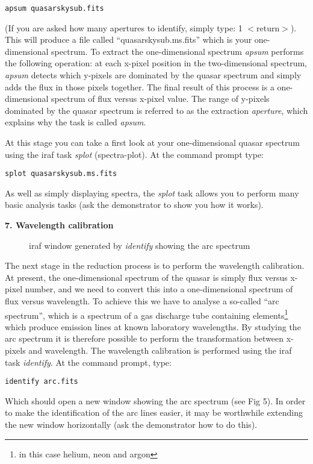 {\tt apsum quasarskysub.fits}

(If you are asked how many apertures to identify, simply type: 1 $<$return$>$).
This will produce a file called ``quasarskysub.ms.fits'' which is your
one-dimensional spectrum. To extract the one-dimensional spectrum
{\it apsum} performs the following operation: at each x-pixel
position in the two-dimensional spectrum, {\it apsum} detects which y-pixels
are dominated by the quasar spectrum and simply adds the flux in those pixels
together. The final result of this process is a one-dimensional
spectrum of flux versus x-pixel value. The range of y-pixels dominated
by the quasar spectrum is referred to as the extraction {\it
aperture}, which explains why the task is called {\it apsum}.

At this stage you can take a first look at your one-dimensional quasar
spectrum using the {\sc iraf} task {\it splot} (spectra-plot). At the
command prompt type:

{\tt splot quasarskysub.ms.fits}

\newpage

As well as simply displaying spectra, the {\it splot} task allows you
to perform many basic analysis tasks (ask the demonstrator to show you
how it works).



{\large {\bf 7. Wavelength calibration}}
\begin{figure}
\centerline{}
\caption{{\sc iraf} window generated by {\it identify} showing the
arc spectrum}
\end{figure}

The next stage in the reduction process is to perform the wavelength
calibration. At present, the one-dimensional spectrum of the quasar is
simply flux versus x-pixel number, and we need to
convert this into a one-dimensional spectrum of flux versus
wavelength. To achieve this we have to analyse a so-called ``arc
spectrum'', which is a spectrum of a gas discharge tube containing
elements\footnote{in this case helium, neon and argon} which produce emission lines at known laboratory
wavelengths. By studying the arc spectrum it is therefore possible to
perform the transformation between x-pixels and wavelength. The
wavelength calibration is performed using the {\sc iraf} task {\it
identify}. At the command prompt, type:

{\tt identify arc.fits}

Which should open a new window showing the arc spectrum (see Fig 5). 
In order to make the identification of the arc lines easier, it
may be worthwhile extending the new window horizontally (ask the
demonstrator how to do this).

